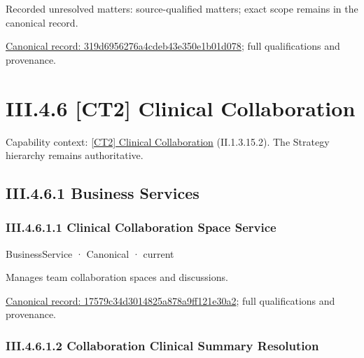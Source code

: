 {\small Recorded unresolved matters: source-qualified matters; exact scope remains in the canonical record.}\par
{\footnotesize \href{../../../../continuum/business/business-process/319d6956276a4cdeb43e350e1b01d078.md}{Canonical record: 319d6956276a4cdeb43e350e1b01d078}; full qualifications and provenance.}\par
\section*{III.4.6 [CT2] Clinical Collaboration}
\label{navigation:III.4.6}

{\small Capability context: \hyperref[element:e6429225463a44d39f82e490e254e5d4]{[CT2] Clinical Collaboration} (II.1.3.15.2). The Strategy hierarchy remains authoritative.}\par
\subsection*{III.4.6.1 Business Services}
\label{navigation:III.4.6.1}

\subsubsection*{III.4.6.1.1 Clinical Collaboration Space Service}
\label{navigation:III.4.6.1.1}

\label{element:17579c34d3014825a878a9ff121e30a2}
{\small BusinessService · Canonical · current}\par

Manages team collaboration spaces and discussions.


{\footnotesize \href{../../../../continuum/business/business-service/17579c34d3014825a878a9ff121e30a2.md}{Canonical record: 17579c34d3014825a878a9ff121e30a2}; full qualifications and provenance.}\par
\subsubsection*{III.4.6.1.2 Collaboration Clinical Summary Resolution}
\label{navigation:III.4.6.1.2}

